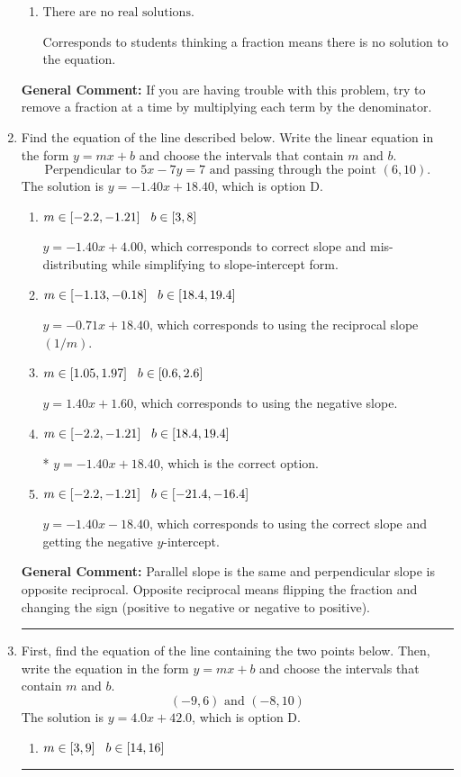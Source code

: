 \documentclass{extbook}[14pt]
\newcommand{\litem}[1]{\item #1

\rule{\textwidth}{0.4pt}}
\begin{document}
\begin{enumerate}
{\begin{enumerate}[label=\Alph*.]
* $x = 7.770$, which is the correct option.
\item \( \text{There are no real solutions.} \)

Corresponds to students thinking a fraction means there is no solution to the equation.
\end{enumerate}

\textbf{General Comment:} If you are having trouble with this problem, try to remove a fraction at a time by multiplying each term by the denominator.
}
\litem{
Find the equation of the line described below. Write the linear equation in the form $ y=mx+b $ and choose the intervals that contain $m$ and $b$.
\[ \text{Perpendicular to } 5 x - 7 y = 7 \text{ and passing through the point } (6, 10). \]The solution is \( y = -1.40x + 18.40 \), which is option D.\begin{enumerate}[label=\Alph*.]
\item \( m \in [-2.2, -1.21] \hspace*{3mm} b \in [3, 8] \)

 $y = -1.40x + 4.00$, which corresponds to correct slope and mis-distributing while simplifying to slope-intercept form.
\item \( m \in [-1.13, -0.18] \hspace*{3mm} b \in [18.4, 19.4] \)

 $y = -0.71x + 18.40$, which corresponds to using the reciprocal slope $(1/m)$.
\item \( m \in [1.05, 1.97] \hspace*{3mm} b \in [0.6, 2.6] \)

 $y = 1.40x + 1.60$, which corresponds to using the negative slope.
\item \( m \in [-2.2, -1.21] \hspace*{3mm} b \in [18.4, 19.4] \)

* $y = -1.40x + 18.40$, which is the correct option.
\item \( m \in [-2.2, -1.21] \hspace*{3mm} b \in [-21.4, -16.4] \)

 $y = -1.40x - 18.40$, which corresponds to using the correct slope and getting the negative $y$-intercept.
\end{enumerate}

\textbf{General Comment:} Parallel slope is the same and perpendicular slope is opposite reciprocal. Opposite reciprocal means flipping the fraction and changing the sign (positive to negative or negative to positive).
}
\litem{
First, find the equation of the line containing the two points below. Then, write the equation in the form $ y=mx+b $ and choose the intervals that contain $m$ and $b$.
\[ (-9, 6) \text{ and } (-8, 10) \]The solution is \( y = 4.0x + 42.0 \), which is option D.\begin{enumerate}[label=\Alph*.]
\item \( m \in [3, 9] \hspace*{3mm} b \in [14, 16] \)


\end{enumerate}}
\end{enumerate}
\end{document}
